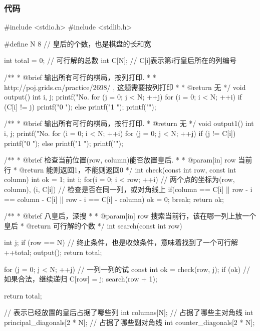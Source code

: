 \subsubsection{代码}
\begin{Codex}[label=eight_queen.c]
#include <stdio.h>
#include <stdlib.h>

#define N 8 // 皇后的个数，也是棋盘的长和宽

int total = 0;  // 可行解的总数
int C[N];  // C[i]表示第i行皇后所在的列编号

/**
 * @brief 输出所有可行的棋局，按列打印.
 *
 * http://poj.grids.cn/practice/2698/ , 这题需要按列打印
 *
 * @return 无
 */
void output() {
    int i, j;
    printf("No. %
    for (j = 0; j < N; ++j) {
        for (i = 0; i < N; ++i) {
            if (C[i] != j) {
                printf("0 ");
            } else {
                printf("1 ");
            }
        }
        printf("\n");
    }
}

/**
 * @brief 输出所有可行的棋局，按行打印.
 * @return 无
 */
void output1() {
    int i, j;
    printf("No. %
    for (i = 0; i < N; ++i) {
        for (j = 0; j < N; ++j) {
            if (j != C[i]) {
                printf("0 ");
            } else {
                printf("1 ");
            }
        }
        printf("\n");
    }
}

/**
 * @brief 检查当前位置(row, column)能否放置皇后.
 *
 * @param[in] row 当前行
 * @return 能则返回1，不能则返回0
 */
int check(const int row, const int column) {
    int ok = 1;
    int i;
    for(i = 0; i < row; ++i) {
        // 两个点的坐标为(row, column), (i, C[i])
        // 检查是否在同一列，或对角线上
        if(column == C[i] || row - i == column - C[i] ||
            row - i == C[i] - column) {
            ok = 0;
            break;
        }
    }
    return ok;
}

/**
 * @brief 八皇后，深搜
 *
 * @param[in] row 搜索当前行，该在哪一列上放一个皇后
 * @return 可行解的个数
 */
int search(const int row) {
    int j;
    if (row == N) { // 终止条件，也是收敛条件，意味着找到了一个可行解
        ++total;
        output();
        return total;
    }

    for (j = 0; j < N; ++j) {  // 一列一列的试
        const int ok = check(row, j);
        if (ok) {  // 如果合法，继续递归
            C[row] = j;
            search(row + 1);
        }
    }

    return total;
}

// 表示已经放置的皇后占据了哪些列
int columns[N];
// 占据了哪些主对角线
int principal_diagonals[2 * N];
// 占据了哪些副对角线
int counter_diagonals[2 * N];


\end{Codex}
